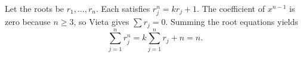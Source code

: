 Let the roots be $r_1,\ldots,r_n$. Each satisfies $r_j^n=kr_j+1$. The coefficient of $x^{n-1}$ is zero because $n\ge3$, so Vieta gives $\sum r_j=0$. Summing the root equations yields
\[
\boxed{\sum_{j=1}^nr_j^n=k\sum_{j=1}^nr_j+n=n}.
\]
